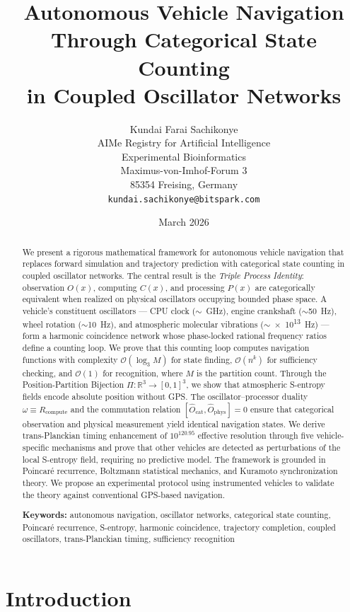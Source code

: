 \documentclass[twocolumn,10pt]{article}
\title{Autonomous Vehicle Navigation Through Categorical State Counting\\
in Coupled Oscillator Networks}
\author{
Kundai Farai Sachikonye\\
AIMe Registry for Artificial Intelligence\\
Experimental Bioinformatics\\
Maximus-von-Imhof-Forum 3\\
85354 Freising, Germany\\
\texttt{kundai.sachikonye@bitspark.com}
}
\date{March 2026}
\theoremstyle{definition}
\theoremstyle{remark}
\newcommand{\Ocat}{\hat{O}_{\mathrm{cat}}}
\newcommand{\Ophys}{\hat{O}_{\mathrm{phys}}}
\newcommand{\R}{\mathbb{R}}
\newcommand{\Ocal}{\mathcal{O}}
\begin{document}
\maketitle

\begin{abstract}
We present a rigorous mathematical framework for autonomous vehicle navigation
that replaces forward simulation and trajectory prediction with categorical
state counting in coupled oscillator networks. The central result is the
\emph{Triple Process Identity}: observation $O(x)$, computing $C(x)$, and
processing $P(x)$ are categorically equivalent when realized on physical
oscillators occupying bounded phase space. A vehicle's constituent oscillators
--- CPU clock ($\sim$\SI{}{GHz}), engine crankshaft ($\sim$\SI{50}{Hz}),
wheel rotation ($\sim$\SI{10}{Hz}), and atmospheric molecular vibrations
($\sim$\SI{e13}{Hz}) --- form a harmonic coincidence network whose
phase-locked rational frequency ratios define a counting loop. We prove that
this counting loop computes navigation functions with complexity
$\Ocal(\log_3 M)$ for state finding, $\Ocal(n^k)$ for sufficiency checking,
and $\Ocal(1)$ for recognition, where $M$ is the partition count. Through the
Position-Partition Bijection $\Pi: \R^3 \to [0,1]^3$, we show that
atmospheric S-entropy fields encode absolute position without GPS. The
oscillator--processor duality $\omega \equiv R_{\mathrm{compute}}$ and the
commutation relation $[\Ocat, \Ophys] = 0$ ensure that categorical
observation and physical measurement yield identical navigation states. We
derive trans-Planckian timing enhancement of $10^{120.95}$ effective
resolution through five vehicle-specific mechanisms and prove that other
vehicles are detected as perturbations of the local S-entropy field,
requiring no predictive model. The framework is grounded in Poincar\'e
recurrence, Boltzmann statistical mechanics, and Kuramoto synchronization
theory. We propose an experimental protocol using instrumented vehicles to
validate the theory against conventional GPS-based navigation.

\medskip
\noindent\textbf{Keywords:} autonomous navigation, oscillator networks, categorical state counting,
Poincar\'e recurrence, S-entropy, harmonic coincidence, trajectory completion,
coupled oscillators, trans-Planckian timing, sufficiency recognition
\end{abstract}

\section{Introduction}\label{sec:intro}
\end{document}
